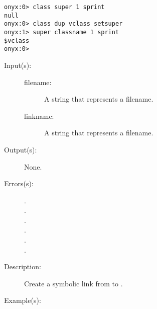 \begin{description}
\begin{description}
\begin{verbatim}
onyx:0> class super 1 sprint
null
onyx:0> class dup vclass setsuper
onyx:1> super classname 1 sprint
$vclass
onyx:0>
		\end{verbatim}
	\end{description}
\label{systemdict:symlink}
\item[{\onyxop{filename linkname}{symlink}{--}}: ]
	\begin{description}\item[]
	\item[Input(s): ]
		\begin{description}\item[]
		\item[filename: ]
			A string that represents a filename.
		\item[linkname: ]
			A string that represents a filename.
		\end{description}
	\item[Output(s): ] None.
	\item[Errors(s): ]
		\begin{description}\item[]
		\item[.]
		\item[.]
		\item[.]
		\item[.]
		\item[.]
		\item[.]
		\end{description}
	\item[Description: ]
		Create a symbolic link from  to
		.
	\item[Example(s): ]\begin{verbatim}


\end{verbatim}
\end{description}
\end{description}
